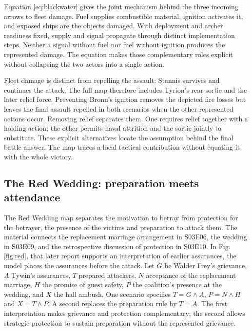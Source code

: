 \documentclass{svproc}
\newcommand{\ep}[1]{\textup{#1}}
\begin{document}
Equation \ref{eq:blackwater} gives the joint mechanism behind the three incoming arrows to fleet damage. Fuel supplies combustible material, ignition activates it, and exposed ships are the objects damaged. With deployment and archer readiness fixed, supply and signal propagate through distinct implementation steps. Neither a signal without fuel nor fuel without ignition produces the represented damage. The equation makes those complementary roles explicit without collapsing the two actors into a single action.

\begin{samepage}
Fleet damage is distinct from repelling the assault: Stannis survives and continues the attack. The full map therefore includes Tyrion's rear sortie and the later relief force. Preventing Bronn's ignition removes the depicted fire losses but leaves the final assault repelled in both scenarios when the other represented actions occur. Removing relief separates them. One requires relief together with a holding action; the other permits naval attrition and the sortie jointly to substitute. These explicit alternatives locate the assumption behind the final battle answer. The map traces a local tactical contribution without equating it with the whole victory.
\par
\end{samepage}

\subsection{The Red Wedding: preparation meets attendance}
The Red Wedding map separates the motivation to betray from protection for the betrayer, the presence of the victims and preparation to attack them. The material connects the replacement marriage arrangement in \ep{S03E06}, the wedding in \ep{S03E09}, and the retrospective discussion of protection in \ep{S03E10}. In Fig. \ref{fig:red}, that later report supports an interpretation of earlier assurances, the model places the assurances before the attack.
Let $G$ be Walder Frey's grievance, $A$ Tywin's assurances, $T$ prepared attackers, $N$ acceptance of the replacement marriage, $H$ the promise of guest safety, $P$ the coalition's presence at the wedding, and $X$ the hall ambush. One scenario specifies $T=G\land A$, $P=N\land H$ and $X=T\land P$. A second replaces the preparation rule by $T=A$. The first interpretation makes grievance and protection complementary; the second allows strategic protection to sustain preparation without the represented grievance.
\end{document}
